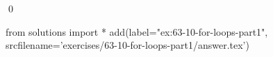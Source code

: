 
\begin{ex}
  \label{ex:63-10-for-loops-part1}
  
  \qed
\end{ex}
\begin{python0}
from solutions import *
add(label="ex:63-10-for-loops-part1",
    srcfilename='exercises/63-10-for-loops-part1/answer.tex')
\end{python0}
